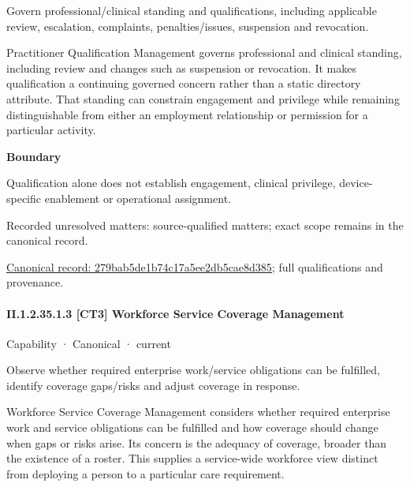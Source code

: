 Govern professional/clinical standing and qualifications, including applicable review, escalation, complaints, penalties/issues, suspension and revocation.



Practitioner Qualification Management governs professional and clinical standing, including review and changes such as suspension or revocation. It makes qualification a continuing governed concern rather than a static directory attribute. That standing can constrain engagement and privilege while remaining distinguishable from either an employment relationship or permission for a particular activity.



\textbf{Boundary}



Qualification alone does not establish engagement, clinical privilege, device-specific enablement or operational assignment.


{\small Recorded unresolved matters: source-qualified matters; exact scope remains in the canonical record.}\par
{\footnotesize \href{../../../../continuum/strategy/capability/279bab5de1b74c17a5ee2db5cae8d385.md}{Canonical record: 279bab5de1b74c17a5ee2db5cae8d385}; full qualifications and provenance.}\par
\paragraph*{II.1.2.35.1.3 [CT3] Workforce Service Coverage Management}
\label{navigation:II.1.2.35.1.3}

\label{element:cfb04e13895745619171a3e8f15d349c}
{\small Capability · Canonical · current}\par

Observe whether required enterprise work/service obligations can be fulfilled, identify coverage gaps/risks and adjust coverage in response.



Workforce Service Coverage Management considers whether required enterprise work and service obligations can be fulfilled and how coverage should change when gaps or risks arise. Its concern is the adequacy of coverage, broader than the existence of a roster. This supplies a service-wide workforce view distinct from deploying a person to a particular care requirement.



